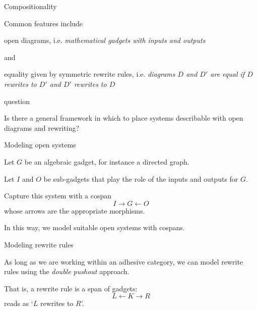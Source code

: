 \begin{frame}{Compositionality}
	
	Common features include
	
	\pause
	
	open diagrams,
	i.e. \emph{mathematical gadgets
	with inputs and outputs}
	
	\pause 
	
	and
	
	equality given by symmetric rewrite rules,
	i.e. \emph{diagrams $D$ and $D'$ are equal
	if $D$ rewrites to $D'$ and $D'$ rewrites to $D$}

\end{frame}


\begin{frame}
	
	question
	
	Is there a general framework
	in which to place systems describable with
	open diagrams and rewriting?
	
\end{frame}


\begin{frame}{Modeling open systems}
	
	Let $G$ be an algebraic gadget,
	for instance a directed graph.
	
	\pause
	
	Let $I$ and $O$ be sub-gadgets
	that play the role of the 
	inputs and outputs for $G$.
	
	\pause
	
	Capture this system with a cospan
	\[
		I \to G \gets O
	\]
	 whose arrows are the appropriate morphisms.
	 
	 \pause
	 
	 In this way, we model suitable open systems
	 with cospans.
	 
\end{frame}


\begin{frame}{Modeling rewrite rules}
	
	As long as we are working within an
	adhesive category, we can
	model rewrite rules using the 
	\emph{double pushout} approach.
	
	\pause
	
	That is, a rewrite rule is a span of gadgets:
	\[
	L \gets K \to R
	\]
	reads as `$L$ rewrites to $R$'. 
	
\end{frame}

